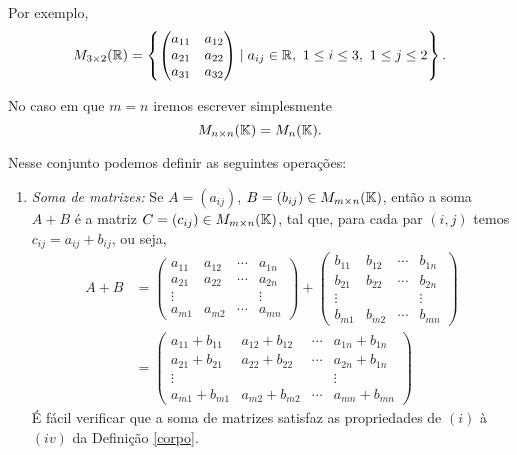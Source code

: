 Por exemplo,
\[
	M_{3\times 2}(\mathbb{R}) = \left\{\begin{pmatrix}a_{11} & a_{12}\\a_{21} & a_{22}\\ a_{31} & a_{32}\end{pmatrix} \mid a_{ij} \in \mathbb{R},\ 1 \le i \le 3,\ 1 \le j \le 2\right\}.
\]


No caso em que $m = n$ iremos escrever simplesmente
\[
	M_{n\times n}(\mathbb{K}) = M_n(\mathbb{K}).
\]

Nesse conjunto podemos definir as seguintes opera\c{c}\~oes:
\begin{enumerate}
	\item \textit{Soma de matrizes:} Se $A = (a_{ij})$, $B = (b_{ij}) \in M_{m\times n}(\mathbb{K})$, ent\~ao a soma $A + B$ \'e a matriz $C = (c_{ij}) \in M_{m\times n}(\mathbb{K})$, tal que, para cada par $(i,j)$ temos $c_{ij} = a_{ij} + b_{ij}$, ou seja,
	\begin{align*}
		A + B &= \begin{pmatrix}
		a_{11} & a_{12} & \cdots & a_{1n}\\
		a_{21} & a_{22} & \cdots & a_{2n}\\
		\vdots & & & \vdots\\
		a_{m1} & a_{m2} & \cdots & a_{mn}
	\end{pmatrix} + \begin{pmatrix}
		b_{11} & b_{12} & \cdots & b_{1n}\\
		b_{21} & b_{22} & \cdots & b_{2n}\\
		\vdots & & & \vdots\\
		b_{m1} & b_{m2} & \cdots & b_{mn}
	\end{pmatrix}\\ &= \begin{pmatrix}
		a_{11} + b_{11} & a_{12} + b_{12} & \cdots & a_{1n} + b_{1n}\\
		a_{21} + b_{21} & a_{22} + b_{22}& \cdots & a_{2n} + b_{1n}\\
		\vdots & & & \vdots\\
		a_{m1} + b_{m1} & a_{m2} + b_{m2}& \cdots & a_{mn} + b_{mn}
	\end{pmatrix}
	\end{align*}
	\'E f\'acil verificar que a soma de matrizes satisfaz as propriedades de $(i)$ \`a $(iv)$ da Defini\c{c}\~ao \ref{corpo}.


\end{enumerate}
